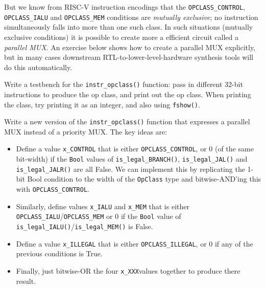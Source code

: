 But we know from RISC-V instruction encodings that the
\verb|OPCLASS_CONTROL|, \verb|OPCLASS_IALU| and \verb|OPCLASS_MEM|
conditions are \emph{mutually exclusive}; no instruction
simultaneously falls into more than one such class.  In such
situations (mutually exclusive conditions) it is possible to create
more a efficient circuit called a \emph{parallel MUX}.  An exercise
below shows how to create a parallel MUX explicitly, but in many cases
downstream RTL-to-lower-level-hardware synthesis tools will do this
automatically.


\hdivider

\Exercise

Write a testbench for the \verb|instr_opclass()| function: pass in
different 32-bit instructions to produce the op class, and print out
the op class.  When printing the class, try printing it as an integer,
and also using \verb|fshow()|.

\Exercise

Write a new version of the \verb|instr_opclass()| function that
expresses a parallel MUX instead of a priority MUX.  The key ideas
are:

  \begin{itemize}

    \item Define a value \verb|x_CONTROL| that is either
      \verb|OPCLASS_CONTROL|, or 0 (of the same bit-width) if the
      \verb|Bool| values of \verb|is_legal_BRANCH()|,
      \verb|is_legal_JAL()| and \verb|is_legal_JALR()| are all False.
      We can implement this by replicating the 1-bit Bool condition to
      the width of the \verb|OpClass| type and bitwise-AND'ing this
      with \verb|OPCLASS_CONTROL|.

    \item Similarly, define values \verb|x_IALU| and \verb|x_MEM| that
       is either \verb|OPCLASS_IALU|/\verb|OPCLASS_MEM| or 0 if the
       \verb|Bool| value of
       \verb|is_legal_IALU()|/\verb|is_legal_MEM()| is False.

    \item Define a value \verb|x_ILLEGAL| that is either
      \verb|OPCLASS_ILLEGAL|, or 0 if any of
      the previous conditions is True.

    \item Finally, just bitwise-OR the four \verb|x_XXX|values
      together to produce there result.

  \end{itemize}

